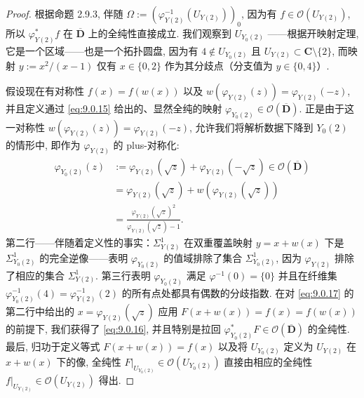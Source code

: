 \begin{proof}
根据命题 2.9.3, 伴随 \(\Omega := \left(\varphi_{Y(2)}^{-1}(U_{Y(2)})\right)_0\), 
因为有 \(f \in \mathcal{O}\left(U_{Y(2)}\right)\), 
所以 \(\varphi_{Y(2)}^*f\) 在 \(\overline{\mathbf{D}}\) 上的全纯性直接成立. 
我们观察到 \(U_{Y_0(2)}\) ——根据开映射定理, 它是一个区域——也是一个拓扑圆盘, 
因为有 \(4 \notin U_{Y_0(2)}\) 且 \(U_{Y(2)} \subset \mathbf{C} \setminus \{2\}\), 
而映射 \(y := x^2/(x-1)\) 仅有 \(x \in \{0,2\}\) 作为其分歧点（分支值为 \(y \in \{0,4\}\)）.

假设现在有对称性 \(f(x) = f(w(x))\) 以及 \(w(\varphi_{Y(2)}(z)) = \varphi_{Y(2)}(-z)\), 
并且定义通过 \eqref{eq:9.0.15} 给出的、显然全纯的映射 \(\varphi_{Y_0(2)} \in \mathcal{O}(\overline{\mathbf{D}})\). 
正是由于这一对称性 \(w(\varphi_{Y(2)}(z)) = \varphi_{Y(2)}(-z)\), 
允许我们将解析数据下降到 \(Y_0(2)\) 的情形中, 
即作为 \(\varphi_{Y(2)}\) 的 plus-对称化:
\begin{equation}\label{eq:9.0.17}
\begin{aligned}
\varphi_{Y_0(2)}(z) 
&:= \varphi_{Y(2)} \left( \sqrt{z} \right) + \varphi_{Y(2)} \left( -\sqrt{z} \right) \in \mathcal{O}(\overline{\mathbf{D}}) \\
&= \varphi_{Y(2)} \left( \sqrt{z} \right) + w \left( \varphi_{Y(2)} \left( \sqrt{z} \right) \right) \\
&= \frac{\varphi_{Y(2)} (\sqrt{z})^2}{\varphi_{Y(2)} (\sqrt{z}) - 1}.
\end{aligned}
\end{equation}
第二行——伴随着定义性的事实：\(\Sigma^1_{Y(2)}\) 在双重覆盖映射 \(y=x+w(x)\) 下是 \(\Sigma^1_{Y_0(2)}\) 的完全逆像——表明 \(\varphi_{Y_0(2)}\) 的值域排除了集合 \(\Sigma^1_{Y_0(2)}\), 
因为 \(\varphi_{Y(2)}\) 排除了相应的集合 \(\Sigma^1_{Y(2)}\). 
第三行表明 \(\varphi_{Y_0(2)}\) 满足 \(\varphi^{-1}(0)=\{0\}\) 
并且在纤维集 \(\varphi^{-1}_{Y_0(2)}(4)=\varphi^{-1}_{Y(2)}(2)\) 的所有点处都具有偶数的分歧指数. 
在对 \eqref{eq:9.0.17} 的第二行中给出的 \(x=\varphi_{Y(2)}(\sqrt{z})\) 应用 \(F(x+w(x))=f(x)=f(w(x))\) 的前提下, 
我们获得了 \eqref{eq:9.0.16}, 
并且特别是拉回 \(\varphi^*_{Y_0(2)}F\in\mathcal{O}(\overline{\mathbf{D}})\) 的全纯性. 
最后, 归功于定义等式 \(F(x+w(x))=f(x)\) 以及将 \(U_{Y_0(2)}\) 定义为 \(U_{Y(2)}\) 在 \(x+w(x)\) 下的像, 
全纯性 \(F|_{U_{Y_0(2)}}\in\mathcal{O}\left(U_{Y_0(2)}\right)\) 直接由相应的全纯性 \(f|_{U_{Y(2)}}\in\mathcal{O}\left(U_{Y(2)}\right)\) 得出.


\end{proof}
